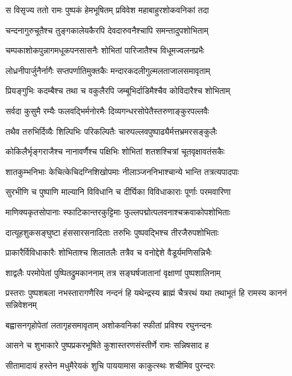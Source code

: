 
\twolineshloka
{स विसृज्य ततो रामः पुष्पकं हेमभूषितम्}
{प्रविवेश महाबाहुरशोकवनिकां तदा} %

\twolineshloka
{चन्दनागुरुचूतैश्च तुङ्गकालेयकैरपि}
{देवदारुवनैश्चापि समन्तादुपशोभिताम्} %

\twolineshloka
{चम्पकाशोकपुन्नागमधूकपनसासनैः}
{शोभितां पारिजातैश्च विधूमज्वलनप्रभैः} %

\twolineshloka
{लोध्रनीपार्जुनैर्नागैः सप्तपर्णातिमुक्तकैः}
{मन्दारकदलीगुल्मलताजालसमावृताम्} %

\twolineshloka
{प्रियङ्गुभिः कदम्बैश्च तथा च वकुलैरपि}
{जम्बूभिर्दाडिमैश्चैव कोविदारैश्च शोभिताम्} %

\twolineshloka
{सर्वदा कुसुमै रम्यैः फलवद्भिर्मनोरमैः}
{दिव्यगन्धरसोपेतैस्तरुणाङ्कुरपल्लवैः} %

\twolineshloka
{तथैव तरुभिर्दिव्यैः शिल्पिभिः परिकल्पितैः}
{चारुपल्लवपुष्पाढ्यैर्मत्तभ्रमरसङ्कुलैः} %

\twolineshloka
{कोकिलैर्भृङ्गराजैश्च नानावर्णैश्च पक्षिभिः}
{शोभितां शतशश्चित्रां चूतवृक्षावतंसकैः} %

\twolineshloka
{शातकुम्भनिभाः केचित्केचिदग्निशिखोपमाः}
{नीलाञ्जननिभाश्चान्ये भान्ति तत्रत्यपादपाः} %

\twolineshloka
{सुरभीणि च पुष्पाणि माल्यानि विविधानि च}
{दीर्घिका विविधाकाराः पूर्णाः परमवारिणा} %

\twolineshloka
{माणिक्यकृतसोपानाः स्फाटिकान्तरकुट्टिमाः}
{फुल्लपद्मोत्पलवनाश्चक्रवाकोपशोभिताः} %

\twolineshloka
{दात्यूहशुकसङ्घुष्टा हंससारसनादिताः}
{तरुभिः पुष्पवद्भिश्च तीरजैरुपशोभिताः} %

\twolineshloka
{प्राकारैर्विविधाकारैः शोभिताश्च शिलातलैः}
{तत्रैव च वनोद्देशे वैडूर्यमणिसन्निभैः} %

\twolineshloka
{शाद्वलैः परमोपेतां पुष्पितद्रुमकाननाम्}
{तत्र सङ्घर्षजातानां वृक्षाणां पुष्पशालिनाम्} %

\threelineshloka
{प्रस्तराः पुष्पशबला नभस्तारागणैरिव}
{नन्दनं हि यथेन्द्रस्य ब्राह्मं चैत्ररथं यथा}
{तथाभूतं हि रामस्य काननं सन्निवेशनम्} %

\twolineshloka
{बह्वासनगृहोपेतां लतागृहसमावृताम्}
{अशोकवनिकां स्फीतां प्रविश्य रघुनन्दनः} %

\twolineshloka
{आसने च शुभाकारे पुष्पप्रकरभूषिते}
{कुशास्तरणसंस्तीर्णे रामः सन्निषसाद ह} %

\twolineshloka
{सीतामादायं हस्तेन मधुमैरेयकं शुचि}
{पाययामास काकुत्स्थः शचीमिव पुरन्दरः} %

